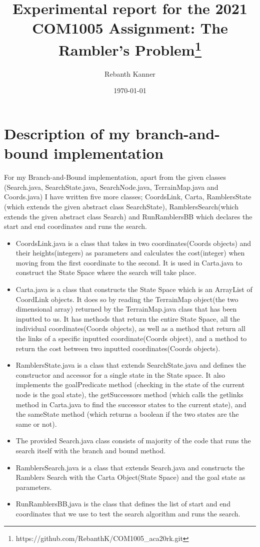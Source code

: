 \documentclass[11pt,oneside]{article}
\title{Experimental report for the 2021 COM1005 Assignment: The Rambler's Problem\footnote{https://github.com/RebanthK/COM1005_aca20rk.git}}
\author{Rebanth Kanner}
\date{\today}
\begin{document}
\maketitle

\section{Description of my branch-and-bound implementation}
For my Branch-and-Bound implementation, apart from the given classes (Search.java, SearchState.java, SearchNode.java, TerrainMap.java and Coords.java) I have written five more classes; CoordsLink, Carta, RamblersState (which extends the given abstract class SearchState), RamblersSearch(which extends the given abstract class Search) and RunRamblersBB which declares the start and end coordinates and runs the search.

\begin{itemize}
    \item CoordsLink.java is a class that takes in two coordinates(Coords objects) and their heights(integers) as parameters and calculates the cost(integer) when moving from the first coordinate to the second. It is used in Carta.java to construct the State Space where the search will take place.
    \item Carta.java is a class that constructs the State Space which is an ArrayList of CoordLink objects. It does so by reading the TerrainMap object(the two dimensional array) returned by the TerrainMap.java class that has been inputted to us. It has methods that return the entire State Space, all the individual coordinates(Coords objects), as well as a method that return all the links of a specific inputted coordinate(Coords object), and a method to return the cost between two inputted coordinates(Coords objects).
    \item RamblersState.java is a class that extends SearchState.java and defines the constructor and accessor for a single state in the State space. It also implements the goalPredicate method (checking in the state of the current node is the goal state), the getSuccessors method (which calls the getlinks method in Carta.java to find the successor states to the current state), and the sameState method (which returns a boolean if the two states are the same or not).
    \item The provided Search.java class consists of majority of the code that runs the search itself with the branch and bound method.
    \item RamblersSearch.java is a class that extends Search.java and constructs the Ramblers Search with the Carta Object(State Space) and the goal state as parameters.
    \item RunRamblersBB,java is the class that defines the list of start and end coordinates that we use to test the search algorithm and runs the search.
\end{itemize}
\end{document}
